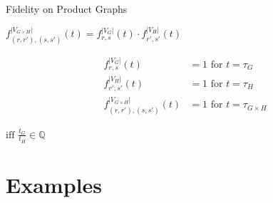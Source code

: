 \documentclass{beamer}
\begin{document}
\begin{frame}[t]{Fidelity on Product Graphs}
	\begin{exampleblock}{}
	\setlength\abovedisplayskip{-8pt}
	\begin{center}
		$ f^{\left|V_{G\times H}\right|}_{(r,r'),(s,s')}(t) = f^{\left|V_G\right|}_{r,s}(t)\cdot f^{\left|V_H\right|}_{r',s'}(t) $
	\end{center}
	\end{exampleblock}
	\begin{align*}
		f^{\left|V_G\right|}_{r,s}(t) &= 1 \text{ for } t = \tau_G \\ 
		f^{\left|V_H\right|}_{r',s'}(t) &= 1 \text{ for } t = \tau_H \\ 
		f^{\left|V_{G\times H}\right|}_{(r,r'),(s,s')}(t) &= 1 \text{ for } t = \tau_{G\times H}
	\end{align*}
	\begin{exampleblock}{}
	\setlength\abovedisplayskip{-8pt}
	\begin{center}
		$ \text{iff }\frac{t_G}{t_H} \in \mathbb{Q}$ %
	\end{center}
	\end{exampleblock}
\end{frame}

\section{Examples}
\end{document}
